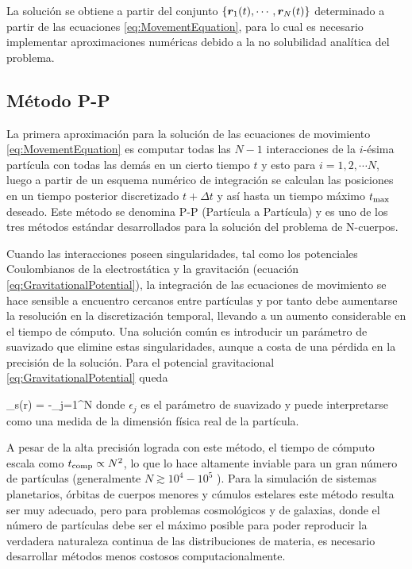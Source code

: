 La solución se obtiene a partir del conjunto $\{ \boldsymbol{ r }_1(t),\cdots, 
\boldsymbol{ r }_N(t) \}$ determinado a partir de las ecuaciones 
\ref{eq:MovementEquation}, para lo cual es necesario implementar 
aproximaciones numéricas debido a la no solubilidad analítica del 
problema.


	\subsection{Método P-P}
	\label{subsec:PPMethos}
	
	
La primera aproximación para la solución de las ecuaciones de movimiento
\ref{eq:MovementEquation} es computar todas las $N-1$ interacciones de la 
$i$-ésima partícula con todas las demás en un cierto tiempo $t$ y esto 
para $i=1,2,\cdots N$, luego a partir de un esquema numérico de 
integración se calculan las posiciones en un tiempo posterior discretizado
$t+\Delta t$ y así hasta un tiempo máximo $t_{\mbox{\scriptsize{max}}}$ deseado. 
Este método se denomina P-P (Partícula a Partícula) y es uno de los tres 
métodos estándar desa\-rrollados para la solución del problema de 
N-cuerpos.


Cuando las interacciones poseen singularidades, tal como los potenciales
Cou\-lombianos de la electrostática y la gravitación (ecuación 
\ref{eq:GravitationalPotential}), la integración de las ecuaciones de 
movimiento se hace sensible a encuentro cercanos entre partículas y por 
tanto debe aumentarse la resolución en la discretización temporal, 
llevando a un aumento considerable en el tiempo de cómputo. Una solución 
común es introducir un parámetro de suavizado que elimine estas 
singularidades, aunque a costa de una pérdida en la precisión de la 
solución. Para el potencial gravitacional \ref{eq:GravitationalPotential} 
queda


{ \phi_{s}(\bds r) = -\sum_{j=1}^N   }
donde $\epsilon_j$ es el parámetro de suavizado y puede interpretarse como 
una medida de la dimensión física real de la partícula.


A pesar de la alta precisión lograda con este método, el tiempo de cómputo
escala como $t_{\mbox{\scriptsize{comp}}}\propto N^2$, lo que lo hace altamente 
inviable para un gran número de partículas (generalmente 
$N\gtrsim 10^4-10^5$ \cite{padmanabhan1995}). Para la simulación de 
sistemas planetarios, órbitas de cuerpos menores y cúmulos estelares este 
método resulta ser muy adecuado, pero para problemas cosmológicos y de 
galaxias, donde el número de partículas debe ser el máximo posible para 
poder reproducir la verdadera naturaleza continua de las distribuciones de 
materia, es necesario desarrollar métodos menos costosos 
computacionalmente.


